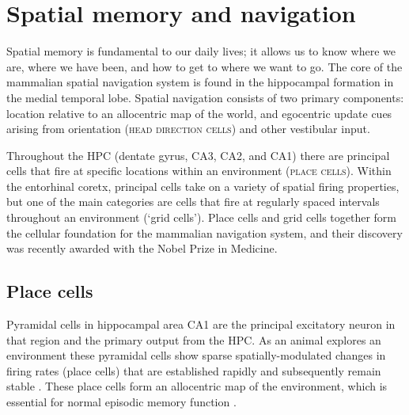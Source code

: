\section{Spatial memory and navigation}
Spatial memory is fundamental to our daily lives; it allows us to know where we are, where we have been, and how to get to where we want to go.
The core of the mammalian spatial navigation system is found in the hippocampal formation in the medial temporal lobe.
Spatial navigation consists of two primary components: location relative to an allocentric map of the world, and egocentric update cues arising from orientation (\textsc{head direction cells}) and other vestibular input.

Throughout the \ac{HPC} (dentate gyrus, CA3, CA2, and CA1) there are principal cells that fire at specific locations within an environment (\textsc{place cells}).
Within the entorhinal coretx, principal cells take on a variety of spatial firing properties, but one of the main categories are cells that fire at regularly spaced intervals throughout an environment (`grid cells').
Place cells and grid cells together form the cellular foundation for the mammalian navigation system, and their discovery was recently awarded with the Nobel Prize in Medicine.


\subsection{Place cells}
Pyramidal cells in hippocampal area CA1 are the principal excitatory neuron in that region and the primary output from the \ac{HPC}.
As an animal explores an environment these pyramidal cells show sparse spatially-modulated changes in firing rates (place cells) that are established rapidly and subsequently remain stable \citep{O'Keefe1971}\citep{Frank2004}.
These place cells form an allocentric map of the environment, which is essential for normal episodic memory function \citep{Smith2006c}\citep{Nakazawa2004}\citep{Buzsaki2013}.

